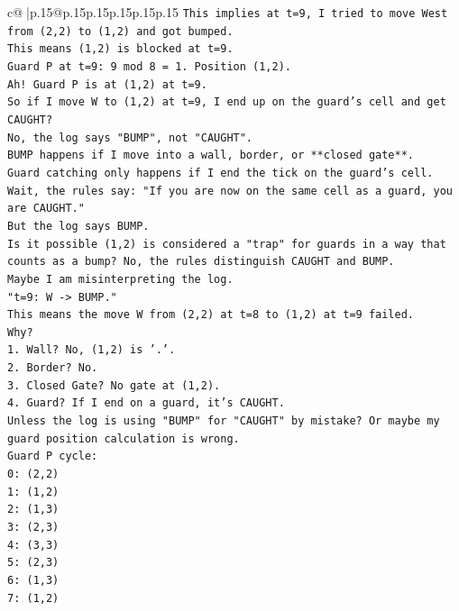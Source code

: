 \documentclass{article}
\begin{document}
{\begin{supertabular}{c@{$\;$}|p{.15\linewidth}@{}p{.15\linewidth}p{.15\linewidth}p{.15\linewidth}p{.15\linewidth}p{.15\linewidth}}
{{{\texttt{This implies at t=9, I tried to move West from (2,2) to (1,2) and got bumped.} \\
\texttt{This means (1,2) is blocked at t=9.} \\
\texttt{Guard P at t=9: 9 mod 8 = 1. Position (1,2).} \\
\texttt{Ah! Guard P is at (1,2) at t=9.} \\
\texttt{So if I move W to (1,2) at t=9, I end up on the guard's cell and get CAUGHT?} \\
\texttt{No, the log says "BUMP", not "CAUGHT".} \\
\texttt{BUMP happens if I move into a wall, border, or **closed gate**.} \\
\texttt{Guard catching only happens if I end the tick on the guard's cell.} \\
\texttt{Wait, the rules say: "If you are now on the same cell as a guard, you are CAUGHT."} \\
\texttt{But the log says BUMP.} \\
\texttt{Is it possible (1,2) is considered a "trap" for guards in a way that counts as a bump? No, the rules distinguish CAUGHT and BUMP.} \\
\texttt{Maybe I am misinterpreting the log.} \\
\texttt{"t=9: W {-}> BUMP."} \\
\texttt{This means the move W from (2,2) at t=8 to (1,2) at t=9 failed.} \\
\texttt{Why?} \\
\texttt{1. Wall? No, (1,2) is '.'.} \\
\texttt{2. Border? No.} \\
\texttt{3. Closed Gate? No gate at (1,2).} \\
\texttt{4. Guard? If I end on a guard, it's CAUGHT.} \\
\texttt{Unless the log is using "BUMP" for "CAUGHT" by mistake? Or maybe my guard position calculation is wrong.} \\
\texttt{Guard P cycle:} \\
\texttt{0: (2,2)} \\
\texttt{1: (1,2)} \\
\texttt{2: (1,3)} \\
\texttt{3: (2,3)} \\
\texttt{4: (3,3)} \\
\texttt{5: (2,3)} \\
\texttt{6: (1,3)} \\
\texttt{7: (1,2)} \\
}}}
\end{supertabular}}
\end{document}
